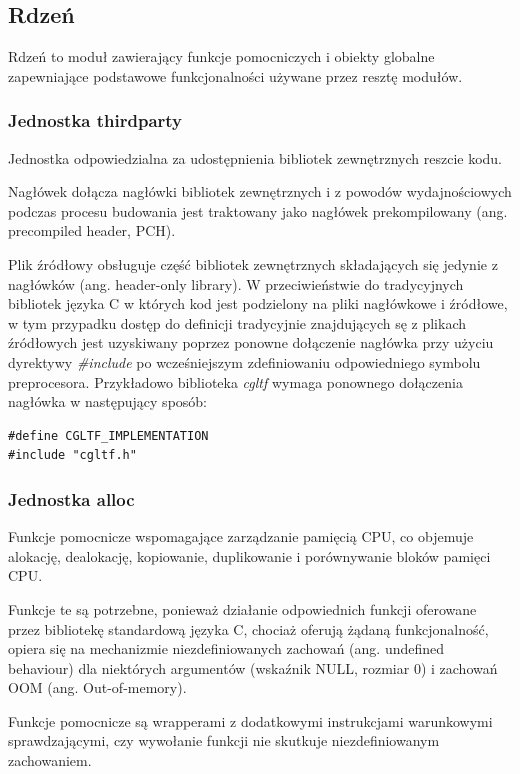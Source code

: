 \subsection{Rdzeń}

Rdzeń to moduł zawierający funkcje pomocniczych i obiekty globalne zapewniające podstawowe funkcjonalności używane przez resztę modułów.

\subsubsection{Jednostka thirdparty}
Jednostka odpowiedzialna za udostępnienia bibliotek zewnętrznych reszcie kodu.

Nagłówek dołącza nagłówki bibliotek zewnętrznych i z powodów wydajnościowych podczas procesu budowania jest traktowany jako nagłówek prekompilowany (ang. precompiled header, PCH).

Plik źródłowy obsługuje część bibliotek zewnętrznych składających się jedynie z nagłówków (ang. header-only library).
W przeciwieństwie do tradycyjnych bibliotek języka C w których kod jest podzielony na pliki nagłówkowe i źródłowe, w tym przypadku dostęp do definicji tradycyjnie znajdujących sę z plikach źródłowych jest uzyskiwany poprzez ponowne dołączenie nagłówka przy użyciu dyrektywy \textit{\#include} po wcześniejszym zdefiniowaniu odpowiedniego symbolu preprocesora.
Przykładowo biblioteka \textit{cgltf} wymaga ponownego dołączenia nagłówka w następujący sposób:
\lstset{language=C}
\begin{lstlisting}[caption={Przykład dołączenia implementacji bibliteki \textit{cgltf}},captionpos=b]
#define CGLTF_IMPLEMENTATION
#include "cgltf.h"
\end{lstlisting}

\subsubsection{Jednostka alloc}
Funkcje pomocnicze wspomagające zarządzanie pamięcią CPU, co objemuje alokację, dealokację, kopiowanie, duplikowanie i porównywanie bloków pamięci CPU.

Funkcje te są potrzebne, ponieważ działanie odpowiednich funkcji oferowane przez bibliotekę standardową języka C, chociaż oferują żądaną funkcjonalność, opiera się na mechanizmie niezdefiniowanych zachowań (ang. undefined behaviour) dla niektórych argumentów (wskaźnik NULL, rozmiar 0) i zachowań OOM (ang. Out-of-memory).

Funkcje pomocnicze są wrapperami z dodatkowymi instrukcjami warunkowymi sprawdzającymi, czy wywołanie funkcji nie skutkuje niezdefiniowanym zachowaniem.

